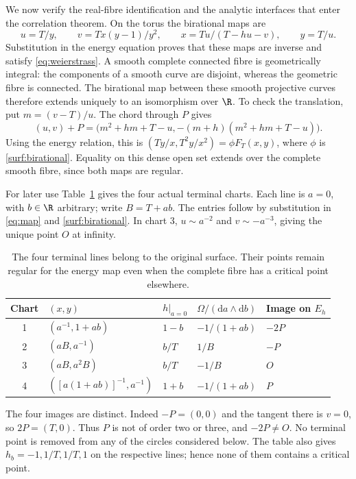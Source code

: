 We now verify the real-fibre identification and the analytic interfaces
that enter the correlation theorem. On the torus the birational maps are
\begin{equation}
 u=T/y,\qquad v=Tx(y-1)/y^2,\qquad
 x=Tu/(T-hu-v),\qquad y=T/u.
 \label{surf:birational}
\end{equation}
Substitution in the energy equation proves that these maps are inverse
and satisfy \eqref{eq:weierstrass}. A smooth complete connected fibre
is geometrically integral: the components of a smooth curve are
disjoint, whereas the geometric fibre is connected. The birational
map between these smooth projective curves therefore extends uniquely
to an isomorphism over $\R$. To check the translation, put
$m=(v-T)/u$. The chord through $P$ gives
\[
 (u,v)+P=
 \bigl(m^2+hm+T-u,-(m+h)(m^2+hm+T-u)\bigr).
\]
Using the energy relation, this is
$(Ty/x,T^2y/x^2)=\phi F_T(x,y)$, where $\phi$ is
\eqref{surf:birational}. Equality on this dense open set extends over
the complete smooth fibre, since both maps are regular.

For later use Table~\ref{surf:terminal-table} gives the four actual
terminal charts. Each line is $a=0$, with $b\in\R$ arbitrary; write
$B=T+ab$. The entries follow by substitution in \eqref{eq:map} and
\eqref{surf:birational}. In chart 3, $u\sim a^{-2}$ and
$v\sim-a^{-3}$, giving the unique point $O$ at infinity.
\begin{table}[htbp]
\centering
\begin{tabular}{@{}cllll@{}}
\toprule
Chart & $(x,y)$ & $h|_{a=0}$ & $\Omega/(\mathrm da\wedge\mathrm db)$ & Image on $E_h$\\
\midrule
1 & $(a^{-1},1+ab)$ & $1-b$ & $-1/(1+ab)$ & $-2P$\\
2 & $(aB,a^{-1})$ & $b/T$ & $1/B$ & $-P$\\
3 & $(aB,a^2B)$ & $b/T$ & $-1/B$ & $O$\\
4 & $([a(1+ab)]^{-1},a^{-1})$ & $1+b$ & $-1/(1+ab)$ & $P$\\
\bottomrule
\end{tabular}
\caption{The four terminal lines belong to the original surface.
Their points remain regular for the energy map even when the complete
fibre has a critical point elsewhere.}
\label{surf:terminal-table}
\end{table}
The four images are distinct. Indeed $-P=(0,0)$ and the tangent there
is $v=0$, so $2P=(T,0)$. Thus $P$ is not of order two or three,
and $-2P\ne O$. No terminal point is removed from any of the circles
considered below. The table also gives $h_b=-1,1/T,1/T,1$ on the
respective lines; hence none of them contains a critical point.

